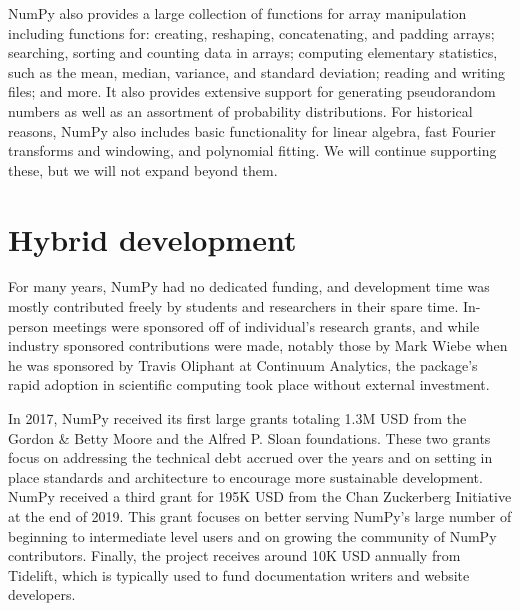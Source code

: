 NumPy also provides a large collection of functions for array manipulation
including functions for:
creating, reshaping, concatenating, and padding arrays;
searching, sorting and counting data in arrays;
computing elementary statistics, such as the mean, median, variance, and standard deviation;
reading and writing files;
and more.
It also provides extensive support for generating pseudorandom numbers
as well as an assortment of probability distributions.
For historical reasons, NumPy also includes basic functionality for
linear algebra, fast Fourier transforms and windowing,
and polynomial fitting.
We will continue supporting these, but we will not expand beyond them.

\section*{Hybrid development}

For many years, NumPy had no dedicated funding, and development time
was mostly contributed freely by students and researchers in their
spare time.  In-person meetings were sponsored off of individual's
research grants, and while industry sponsored contributions were made,
notably those by Mark Wiebe when he was sponsored by Travis Oliphant
at Continuum Analytics, the package's rapid adoption in scientific
computing took place without external investment.

In 2017, NumPy received its first large grants totaling 1.3M USD from the
Gordon \& Betty Moore and the Alfred P. Sloan foundations.
These two grants focus on addressing the technical debt accrued over the years and
on setting in place standards and architecture to encourage more sustainable development.
NumPy received a third grant for 195K USD from the Chan Zuckerberg
Initiative at the end of 2019.
This grant focuses on better serving NumPy's large number of beginning
to intermediate level users and on growing the community of NumPy
contributors.
Finally, the project receives around 10K USD annually from Tidelift, which is
typically used to fund documentation writers and website developers.

